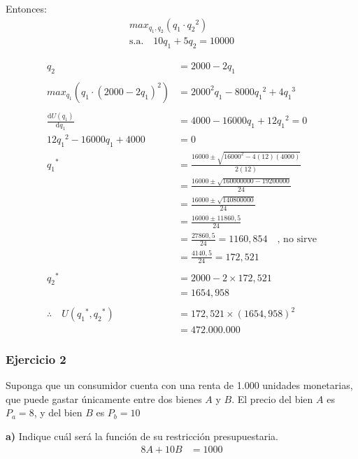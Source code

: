 \documentclass{templateNote}
\begin{document}
Entonces:
\begin{equation*}
    \begin{split}
        max_{q_1, q_2} (q_1 \cdot {q_2}^2) \\
        \text{s.a.} \quad 10q_1 + 5q_2 = 10000
    \end{split}
\end{equation*}

\begin{align*}
    q_2 &= 2000 -2q_1 \\
    \\
    max_{q_1} (q_1 \cdot (2000 -2q_1)^2) &= {2000}^2 q_1 - 8000 {q_1}^2 + 4{q_1}^3 \\
    \\
    \frac{\mathrm{d} U(q_1)}{\mathrm{d}q_1} &= 4000 - 16000q_1 + 12{q_1}^2 = 0 \\
    12{q_1}^2 - 16000q_1 + 4000 &= 0 \\
    {q_1}^* &= \frac{16000 \pm \sqrt{16000^2 - 4(12)(4000)}}{2(12)} \\
    &= \frac{16000 \pm \sqrt{160000000 - 19200000}}{24} \\
    &= \frac{16000 \pm \sqrt{140800000}}{24} \\
    &= \frac{16000 \pm 11860,5}{24} \\
    &= \frac{27860,5}{24} = 1160,854 \quad \text{, no sirve}\\
    &= \frac{4140,5}{24} = 172,521 \\
    \\
    {q_2}^* &= 2000 -2 \times 172,521 \\
    &= 1654,958 \\
    \\
    \therefore \quad U({q_1}^*, {q_2}^*) &= 172,521 \times (1654,958)^2 \\
    &= 472.000.000
\end{align*}

\newpage
\subsubsection{Ejercicio 2}
\indent
Suponga que un consumidor cuenta con una renta de 1.000 unidades monetarias, que
puede gastar únicamente entre dos bienes $A$ y $B$. El precio del bien $A$ es $P_a = 8$, y del bien
$B$ es $P_b = 10$

\textbf{a)} Indique cuál será la función de su restricción presupuestaria.
\begin{align*}
    8A + 10B &= 1000
\end{align*}
\end{document}
